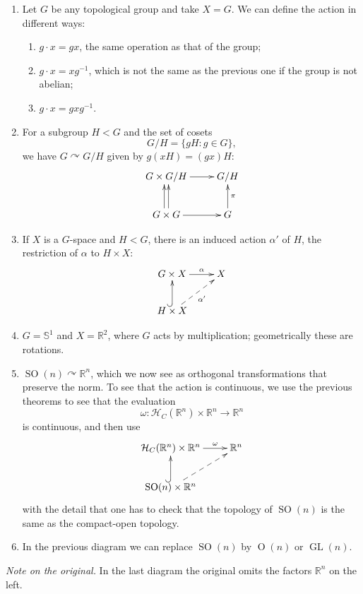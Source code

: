 \begin{example}
\label{example-actions}
\begin{enumerate}
\item Let $G$ be any topological group
and take $X=G$. We can define the
action in different ways:
\begin{enumerate}
\item $g\cdot x=gx$, the same operation
as that of the group;
\item $g\cdot x=xg^{-1}$, which is not
the same as the previous one if the
group is not abelian;
\item $g\cdot x=gxg^{-1}$.
\end{enumerate}
\item For a subgroup $H<G$ and the set
of cosets
$$
G/H=\{gH:g\in G\},
$$
we have $G\curvearrowright G/H$ given
by $g(xH)=(gx)H$:
$$
\xymatrix{
G\times G/H \ar[r] & G/H \\
G\times G \ar@<0.5ex>[u]
  \ar@<-0.5ex>[u] \ar[r]
  & G \ar[u]_{\pi}
}
$$
\item If $X$ is a $G$-space and $H<G$,
there is an induced action $\alpha'$ of
$H$, the restriction of $\alpha$ to
$H\times X$:
$$
\xymatrix{
G\times X \ar[r]^-{\alpha} & X \\
H\times X \ar@{^{(}->}[u]
  \ar@{-->}[ur]_{\alpha'}
}
$$
\item $G=\mathbb{S}^1$ and
$X=\mathbb{R}^2$, where $G$ acts by
multiplication; geometrically these are
rotations.
\item
$\operatorname{SO}(n)
\curvearrowright\mathbb{R}^n$, which we
now see as orthogonal transformations
that preserve the norm. To see that the
action is continuous, we use the
previous theorems to see that the
evaluation
$$
\omega:
\mathcal{H}_C(\mathbb{R}^n)
\times\mathbb{R}^n
\to\mathbb{R}^n
$$
is continuous, and then use
$$
\xymatrix{
\mathcal{H}_C(\mathbb{R}^n)
  \times\mathbb{R}^n
  \ar[r]^-{\omega}
  & \mathbb{R}^n \\
\operatorname{SO}(n)
  \times\mathbb{R}^n
  \ar@{^{(}->}[u] \ar@{-->}[ur]
}
$$
with the detail that one has to check
that the topology of
$\operatorname{SO}(n)$ is the same as
the compact-open topology.
\item In the previous diagram we can
replace $\operatorname{SO}(n)$ by
$\operatorname{O}(n)$ or
$\operatorname{GL}(n)$.
\end{enumerate}
\end{example}

\noindent
{\it Note on the original.} In the last
diagram the original omits the factors
$\mathbb{R}^n$ on the left.

